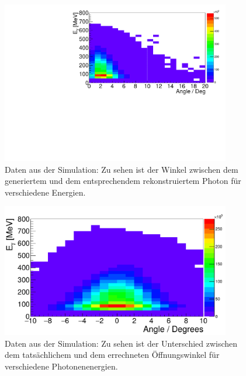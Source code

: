 \documentclass[a4paper,11pt,oneside,final,german,openbib,pdftex]{scrbook}
\begin{document}
{\begin{appendix}
\begin{figure}[h!]
	\begin{center}
		\includegraphics[width=100mm]{AngleRegGen/20171804TrueCandsAngleDeviation}
		\caption[Simulation: Winkel zwischen gen. und rek. Photon]{Daten aus der Simulation: Zu sehen ist der Winkel zwischen dem generiertem und dem entsprechendem rekonstruiertem Photon f\"ur verschiedene Energien.}
		\label{fig:Angle-Rec-Gen-Hist}
	\end{center}
\end{figure}





\begin{figure}[h!]
	\begin{center}
		\includegraphics[width=100mm]{NewCalib/20171904SimOpeningAngleDeviation}
		\caption[Simulation: Unterschied zwischen dem rek. und den gen. \"Offnungswinkel]{Daten aus der Simulation: Zu sehen ist der Unterschied zwischen dem tats\"achlichem und dem errechneten \"Offnungswinkel f\"ur verschiedene Photonenenergien.}
		\label{fig:Unterschied-Rec-Gen-Opening-Angle}
	\end{center}
\end{figure}



\end{appendix}}
\end{document}
